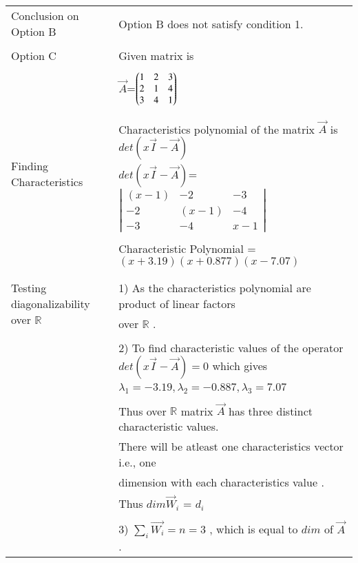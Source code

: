 \documentclass[journal,12pt]{IEEEtran}
\begin{document}
\begin{longtable}{|l|l|}
&\\
\hline
\multirow{3}{*}{Conclusion on Option B} & \\
& Option B does not satisfy condition 1. \\
&\\
\hline \hline
\multirow{3}{*}{Option C} & \\
& Given matrix is  \\
&\\
& $\vec{A}$=$\begin{pmatrix}1&2&3\\2&1&4\\3&4&1\end{pmatrix}$\\
&\\
\hline
\multirow{3}{*}{Finding Characteristics} & \\
&
Characteristics polynomial of the matrix $\vec{A}$ is $det(x\vec{I}-\vec{A})$\\ 
polynomial
& $det(x\vec{I}-\vec{A})$= $\left|
                \begin{array}{ccc}
                (x-1) & -2 & -3\\
                -2 & (x-1) & -4\\
                -3 & -4 & x-1
                \end{array} \right|$  \\
&\\
& Characteristic Polynomial = $(x+3.19)(x+0.877)(x-7.07)$\\
&\\
\hline
\multirow{3}{*}{Testing diagonalizability over $\mathbb{R}$} & \\
& 1) As the characteristics  polynomial are product of linear factors\\
&over $\mathbb{R}$ .\\
&\\
&2) To find characteristic values of the operator $det(x\vec{I}-\vec{A})=0$ which gives  \\
& $\lambda_1= -3.19 , \lambda_2= -0.887, \lambda_3= 7.07$\\
&\\
& Thus over $\mathbb{R}$ matrix $\vec{A}$ has three distinct characteristic values.\\
&There will be atleast one characteristics vector i.e., one\\ & dimension with each characteristics value .\\
&Thus $dim \vec{W}_i$ = $d_i$\\
&\\
&3) $\sum_{i} \vec{W_i} = n = 3$ , which is equal to $dim$ of $\vec{A}$.\\ 

\end{longtable}
\end{document}
